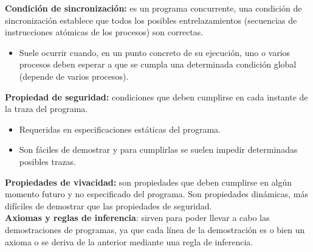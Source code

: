 \documentclass[a4paper,11pt]{article}
\begin{document}
\textbf{Condición de sincronización:} es un programa concurrente, una condición de sincronización establece que todos los posibles entrelazamientos (secuencias de instrucciones atómicas de los procesos) son correctas.

\begin{itemize}
\item Suele ocurrir cuando, en un punto concreto de su ejecución, uno o varios procesos deben esperar a que se cumpla una determinada condición global (depende de varios procesos).
\end{itemize}

\textbf{Propiedad de seguridad:} condiciones que deben cumplirse en cada instante de la traza del programa.

\begin{itemize}
\item Requeridas en especificaciones estáticas del programa.
\item Son fáciles de demostrar y para cumplirlas se suelen impedir determinadas posibles trazas.
\end{itemize}

\textbf{Propiedades de vivacidad:} son propiedades que deben cumplirse en algún momento futuro y no especificado del programa. Son propiedades dinámicas, más difíciles de demostrar que las propiedades de seguridad. \\

\textbf{Axiomas y reglas de inferencia}: sirven para poder llevar a cabo las demostraciones de programas, ya que cada línea de la demostración es o bien un axioma o se deriva de la anterior mediante una regla de inferencia.
\end{document}
